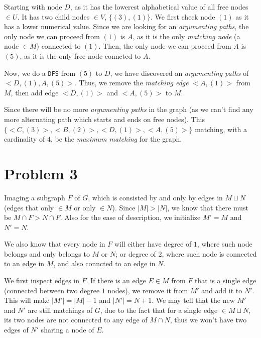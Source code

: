 \documentclass[11pt]{article}
\newcommand{\ilc}{\texttt}
\begin{document}
Starting with node $D$, as it has the lowerest alphabetical value of all free nodes $\in U$. It has two child nodes $\in V$, $\{(3), (1)\}$. We first check node $(1)$ as it has a lower numerical value. Since we are looking for an \textit{argumenting paths}, the only node we can proceed from $(1)$ is $A$, as it is the only \textit{matching node} (a node $\in M$) connected to $(1)$. Then, the only node we can proceed from $A$ is $(5)$, as it is the only free node conncted to $A$.

Now, we do a \ilc{DFS} from $(5)$ to $D$, we have discovered an \textit{argumenting paths} of $<D, (1), A, (5)>$. Thus, we remove the \textit{matching edge} $<A, (1)>$ from $M$, then add edge $<D, (1)>$ and $<A, (5)>$ to $M$.\newline

Since there will be no more \textit{argumenting paths} in the graph (as we can't find any more alternating path which starts and ends on free nodes). This $\{ <C, (3)>, <B, (2)>, <D, (1)>, <A, (5)> \}$ matching, with a cardinality of $4$, be the \textit{maximum matching} for the graph.

\section{Problem 3}

Imaging a subgraph $F$ of $G$, which is consisted by and only by edges in $M \sqcup N$ (edges that only $\in M$ or only $\in N$). Since $|M| > |N|$, we know that there must be $M \cap F > N \cap F$. Also for the ease of description, we initialize $M' = M$ and $N' = N$.

We also know that every node in $F$ will either have degree of $1$, where such node belongs and only belongs to $M$ or $N$; or degree of $2$, where such node is connected to an edge in $M$, and also conncted to an edge in $N$. \newline


We first inspect edges in $F$. If there is an edge $E \in M$ from $F$ that is a single edge (connected between two degree $1$ nodes), we remove it from $M'$ and add it to $N'$. This will make $|M'| = |M| - 1$ and $|N'| = N + 1$. We may tell that the new $M'$ and $N'$ are still matchings of $G$, due to the fact that for a single edge $\in M \sqcup N$, its two nodes are not connected to any edge of $M \cap N$, thus we won't have two edges of $N'$ sharing a node of $E$.\newline
\end{document}
